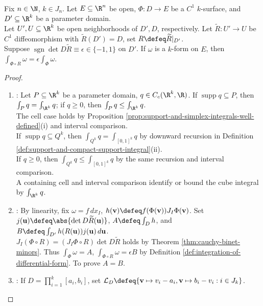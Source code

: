 \begin{theorem} \label{thm:forms-reparametrization-naturality} \\
Fix $n\in\N$, $k\in J_n$. Let $E\subseteq\R^n$ be open, $\Phi:D\to E$ be a $C^1$ $k$-surface, and $D'\subseteq\R^k$ be a parameter domain.\\
Let $U',U\subseteq\R^k$ be open neighborhoods of $D',D$, respectively. Let $\widetilde R:U'\to U$ be $C^1$ diffeomorphism with $\widetilde R(D')=D$, set $R\defeq\widetilde R|_{D'}$.\\
Suppose $\operatorname{sgn}\det D\widetilde R\equiv\epsilon\in\{-1,1\}$ on $D'$. If $\omega$ is a $k$-form on $E$, then $\int_{\Phi\circ R}\omega=\epsilon\int_\Phi\omega$.
\begin{proof}
\begin{enumerate}[label=(\roman*)]
\setlength{\itemsep}{0pt}
\item {}: Let $P\subseteq\R^k$ be a parameter domain, $q\in C_c(\R^k,\R)$. If $\operatorname{supp}q\subseteq P$, then $\int_Pq=\int_{\R^k}q$; if $q\geq0$, then $\int_Pq\leq\int_{\R^k}q$.\\
The cell case holds by Proposition \ref{prop:support-and-simplex-integrals-well-defined}(i) and interval comparison.\\
If $\operatorname{supp}q\subseteq Q^k$, then $\int_{Q^k}q=\int_{[0,1]^k}q$ by downward recursion in Definition \ref{def:support-and-compact-support-integral}(ii).\\
If $q\geq0$, then $\int_{Q^k}q\leq\int_{[0,1]^k}q$ by the same recursion and interval comparison.\\
A containing cell and interval comparison identify or bound the cube integral by $\int_{\R^k}q$.
\item {}: By linearity, fix $\omega=f\,dx_I$, $h(\mathbf v)\defeq f(\Phi(\mathbf v))J_I\Phi(\mathbf v)$. Set $j(\mathbf u)\defeq\abs{\det D\widetilde R(\mathbf u)}$, $A\defeq\int_Dh$, and $B\defeq\int_{D'}h(R(\mathbf u))j(\mathbf u)\,d\mathbf u$.\\
$J_I(\Phi\circ R)=(J_I\Phi\circ R)\det D\widetilde R$ holds by Theorem \ref{thm:cauchy-binet-minors}. Thus $\int_\Phi\omega=A$, $\int_{\Phi\circ R}\omega=\epsilon B$ by Definition \ref{def:integration-of-differential-form}. To prove $A=B$.
\item {}: If $D=\prod\limits_{i=1}^{k}[a_i,b_i]$, set $\mathcal L_D\defeq\{\mathbf v\mapsto v_i-a_i,\mathbf v\mapsto b_i-v_i:i\in J_k\}$.\\

\end{enumerate}
\end{proof}
\end{theorem}
